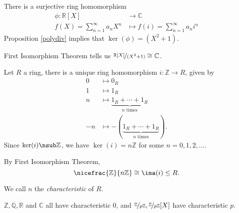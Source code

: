 \begin{example}
    There is a surjective ring homomorphism
    \[
    \begin{aligned}
      \phi
      \colon \mathbb{R}[X] & \longrightarrow   \mathbb{C} \\
      f(X) = \sum\limits_{n=1}^{\infty} a_n X^n & \longmapsto f(i) = \sum\limits_{n=1}^{\infty} a_n i^n
    \end{aligned}
    \]
    Proposition \eqref{polydiv} implies that \(\ker(\phi) = (X^2 + 1)\).

    First Isomorphism Theorem tells us \(\nicefrac{\mathbb{R}[X]}{(X^{2}+1)}\cong \mathbb{C}\).
\end{example}
\begin{example}
    Let \(R\) a ring, there is a unique ring homomorphism \(i: \mathbb{Z} \to R\), given by
    \begin{align*}
        0 &\longmapsto 0_R\\
        1 &\longmapsto 1_R\\
        n &\longmapsto \underbrace{1_R + \cdots + 1_R}_{n \text{ times}}\\
        -n &\longmapsto -(\underbrace{1_R + \cdots + 1_R}_{n \text{ times}}).
    \end{align*}
    Since \(\ker(i) \nsub \mathbb{Z}\), we have \(\ker(i) = n\mathbb{Z}\) for some \(n = 0,1,2, \ldots\).

    By First Isomorphism Theorem,
    \[
        \nicefrac{\mathbb{Z}}{n\mathbb{Z}}\cong \ima(i) \leq R.
    \]
\end{example}
\begin{definition}{}{}
    We call \(n\)  the \textit{characteristic} of \(R\).
\end{definition}
\begin{example}
    \(\mathbb{Z},\mathbb{Q},\mathbb{R}\) and \(\mathbb{C}\) all have characteristic 0, and \(\nicefrac{\mathbb{Z}}{p\mathbb{Z}}, \nicefrac{\mathbb{Z}}{p\mathbb{Z}}[X]\) have characteristic \(p\).
\end{example}
